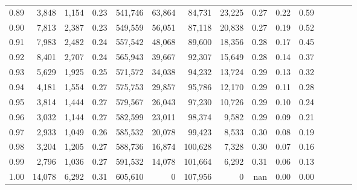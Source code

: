\begin{tabular}{rrrcrrrrrrrrrrr}
0.89 &   3,848 &  1,154 &                                       0.23 &  541,746 &   63,864 &   84,731 &   23,225 &  0.27 &  0.22 &                         0.59 \\
0.90 &   7,813 &  2,387 &                                       0.23 &  549,559 &   56,051 &   87,118 &   20,838 &  0.27 &  0.19 &                         0.52 \\
0.91 &   7,983 &  2,482 &                                       0.24 &  557,542 &   48,068 &   89,600 &   18,356 &  0.28 &  0.17 &                         0.45 \\
0.92 &   8,401 &  2,707 &                                       0.24 &  565,943 &   39,667 &   92,307 &   15,649 &  0.28 &  0.14 &                         0.37 \\
0.93 &   5,629 &  1,925 &                                       0.25 &  571,572 &   34,038 &   94,232 &   13,724 &  0.29 &  0.13 &                         0.32 \\
0.94 &   4,181 &  1,554 &                                       0.27 &  575,753 &   29,857 &   95,786 &   12,170 &  0.29 &  0.11 &                         0.28 \\
0.95 &   3,814 &  1,444 &                                       0.27 &  579,567 &   26,043 &   97,230 &   10,726 &  0.29 &  0.10 &                         0.24 \\
0.96 &   3,032 &  1,144 &                                       0.27 &  582,599 &   23,011 &   98,374 &    9,582 &  0.29 &  0.09 &                         0.21 \\
0.97 &   2,933 &  1,049 &                                       0.26 &  585,532 &   20,078 &   99,423 &    8,533 &  0.30 &  0.08 &                         0.19 \\
0.98 &   3,204 &  1,205 &                                       0.27 &  588,736 &   16,874 &  100,628 &    7,328 &  0.30 &  0.07 &                         0.16 \\
0.99 &   2,796 &  1,036 &                                       0.27 &  591,532 &   14,078 &  101,664 &    6,292 &  0.31 &  0.06 &                         0.13 \\
1.00 &  14,078 &  6,292 &                                       0.31 &  605,610 &        0 &  107,956 &        0 &   nan &  0.00 &                         0.00 \\
\bottomrule
\end{tabular}
